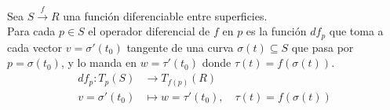 Sea $S \xrightarrow{f} R$ una función diferenciable entre superficies.\\
   Para cada $p \in S$ el operador diferencial de $f$ en $p$ es la función $df_p$ que toma a cada vector $v = \sigma'(t_0)$ tangente de una curva $\sigma(t) \subseteq S$ que pasa por $p = \sigma(t_0)$, y lo manda en $w = \tau'(t_0)$ donde $\tau(t) = f(\sigma(t))$.
   \begin{align*}
   df_p : T_p(S) &\longrightarrow T_{f(p)}(R) \\
   v = \sigma'(t_0) &\longmapsto w = \tau'(t_0), \quad \tau(t) = f(\sigma(t))
   \end{align*}
